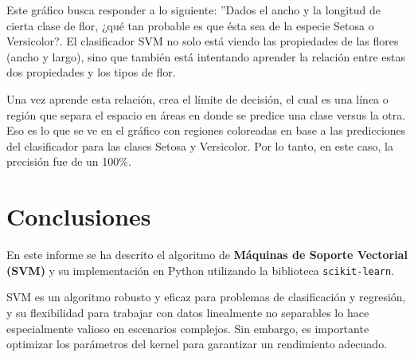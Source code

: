 \documentclass[a4paper,12pt]{article}
\begin{document}
Este gráfico busca responder a lo siguiente: ''Dados el ancho y la longitud de cierta clase de flor, ¿qué tan probable es que ésta sea de la especie Setosa o Versicolor?. El clasificador SVM no solo está viendo las propiedades de las flores (ancho y largo), sino que también está intentando aprender la relación entre estas dos propiedades y los tipos de flor.

Una vez aprende esta relación, crea el límite de decisión, el cual es una línea o región que separa el espacio en áreas en donde se predice una clase versus la otra. Eso es lo que se ve en el gráfico con regiones coloreadas en base a las predicciones del clasificador para las clases Setosa y Versicolor. Por lo tanto, en este caso, la precisión fue de un 100\%.

\section{Conclusiones}
En este informe se ha descrito el algoritmo de \textbf{Máquinas de Soporte Vectorial (SVM)} y su implementación en Python utilizando la biblioteca \texttt{scikit-learn}.

SVM es un algoritmo robusto y eficaz para problemas de clasificación y regresión, y su flexibilidad para trabajar con datos linealmente no separables lo hace especialmente valioso en escenarios complejos. Sin embargo, es importante optimizar los parámetros del kernel para garantizar un rendimiento adecuado.
\end{document}
